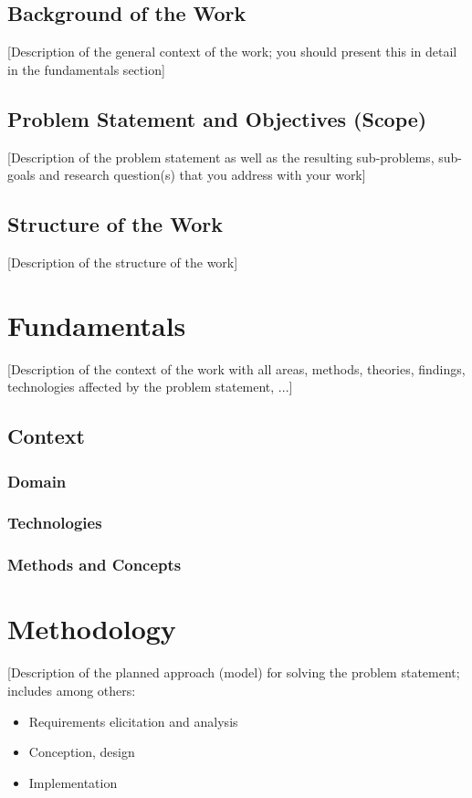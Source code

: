 \documentclass[oneside,12pt]{book}
\begin{document}
\section{Background of the Work}
[Description of the general context of the work; you should present this in detail in the fundamentals section]

\section{Problem Statement and Objectives (Scope)}
[Description of the problem statement as well as the resulting sub-problems, sub-goals and research question(s) that you address with your work]

\section{Structure of the Work}
[Description of the structure of the work]

\chapter{Fundamentals}
[Description of the context of the work with all areas, methods, theories, findings, technologies affected by the problem statement, ...]

\section{Context}

\subsection{Domain}

\subsection{Technologies}

\subsection{Methods and Concepts}

\chapter{Methodology}
[Description of the planned approach (model) for solving the problem statement; includes among others:
\begin{itemize}
\item Requirements elicitation and analysis
\item Conception, design
\item Implementation
\end{itemize}
\end{document}
